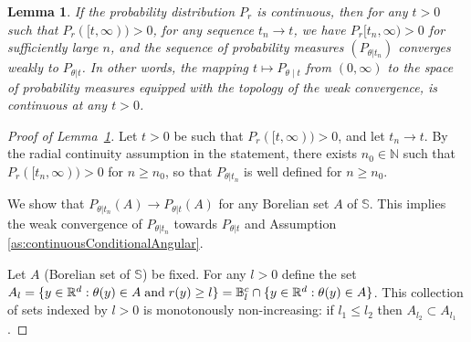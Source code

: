 \documentclass{article}
\numberwithin{equation}{section}
\newtheorem{lemma}{Lemma}[section]
\newcommand{\R}{\mathbb{R}}
\renewcommand{\P}{\mathbb{P}}
\newcommand{\nset}{\mathbb{N}}
\newcommand{\sphere}{\mathbb{S}}
\newcommand{\ball}{\mathbb{B}}
\begin{document}
\begin{lemma}\label{lem:continuousRadialImpliesContinuousConditional}
  If the probability distribution $P_r$ is continuous, then
   for any $t>0$ such that $P_r([t,\infty))>0$, for any sequence $t_n\to t$, we have  $P_r[t_n,\infty)>0$ for sufficiently large $n$, and the sequence of probability measures $(P_{\theta|t_n})$ converges weakly to $P_{\theta|t}$. In other words, 
  the mapping   $t\mapsto P_{\theta\mid t}$ from
    $(0,\infty)$ to the space of probability measures equipped with the
    topology of the weak convergence, is continuous at any  $t>0$.%
\end{lemma}
\begin{proof}[Proof of Lemma~\ref{lem:continuousRadialImpliesContinuousConditional}]
Let $t>0$ be  such that $P_r([t,\infty))>0$, and let $t_n\to t$. By the radial continuity assumption in the statement, there exists $n_0\in\nset$ such that $P_{r}([t_n,\infty))>0$ for $n\ge n_0$, so that $P_{\theta|t_n}$ is well defined for $n\ge n_0$. 


We show that %
\(P_{\theta|t_n}(A)\to P_{\theta|t}(A)\) for any Borelian set
\(A\) of \(\sphere\). %
This implies
the weak convergence of \(P_{\theta|t_n}\) towards \(P_{\theta|t}\)
and Assumption \ref{as:continuousConditionalAngular}.

Let \(A\) (Borelian set of \(\sphere\)) be fixed. For any \(l>0\) define the set
\(A_l=\{ y\in \R^d:\theta(y)\in A \;\textnormal{and}\;  r(y)\geq l \}
= \ball_{l}^{c}\cap \{y\in\R^d:\theta(y)\in A\}\). %
This
collection of sets indexed by $l>0$ is monotonously non-increasing:  %
if
\(l_1\leq  l_2\) then \(A_{l_2}  \subset A_{l_1}\).


\end{proof}
\end{document}
